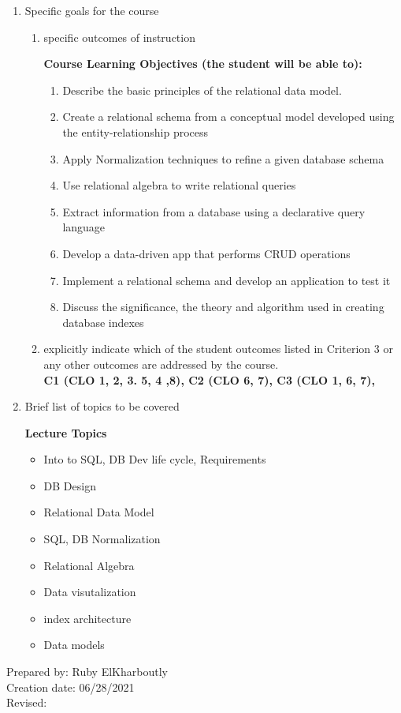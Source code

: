 \begin{enumerate}[1.]
\begin{enumerate}[a.]
\end{enumerate}

\item Specific goals for the course
\begin{enumerate}
\item specific outcomes of instruction\\ %
  {\bfseries
    Course Learning Objectives (the student will be able to):
\begin{enumerate}
\item Describe the basic principles of the relational data model.
\item Create a relational schema from a conceptual model developed using the entity-relationship process
\item Apply Normalization techniques to refine a given database schema
\item Use relational algebra to write relational queries
\item Extract information from a database using a declarative query language
\item Develop a data-driven app that performs CRUD operations
\item Implement a relational schema and develop an application to test it
\item Discuss the significance, the theory and algorithm used in creating database indexes
\end{enumerate}
  }

\item explicitly indicate which of the student outcomes listed in Criterion 3 or any other outcomes are addressed by the course.\\
  {\bfseries
    C1 (CLO 1, 2, 3. 5, 4 ,8),
    C2 (CLO 6, 7),
    C3 (CLO 1, 6, 7),
  }
\end{enumerate}

\item Brief list of topics to be covered\\
  {\bfseries
    Lecture Topics
    \begin{itemize}
	\item Into to SQL, DB Dev life cycle, Requirements
	\item DB Design
	\item Relational Data Model
	\item SQL, DB Normalization
	\item Relational Algebra
	\item Data visutalization
	\item index architecture
	\item 	Data models

    \end{itemize}
  }

\end{enumerate}

\noindent Prepared by: Ruby ElKharboutly\\
\noindent Creation date: 06/28/2021\\
\noindent Revised:\\
